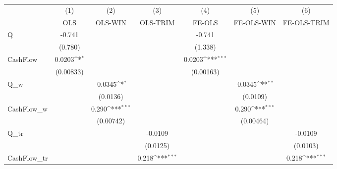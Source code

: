 {
\def\sym#1{\ifmmode^{#1}\else\(^{#1}\)\fi}
\begin{tabular}{l*{6}{c}}
\hline\hline
            &\multicolumn{1}{c}{(1)}         &\multicolumn{1}{c}{(2)}         &\multicolumn{1}{c}{(3)}         &\multicolumn{1}{c}{(4)}         &\multicolumn{1}{c}{(5)}         &\multicolumn{1}{c}{(6)}         \\
            &         OLS         &     OLS-WIN         &    OLS-TRIM         &      FE-OLS         &  FE-OLS-WIN         & FE-OLS-TRIM         \\
\hline
Q           &      -0.741         &                     &                     &      -0.741         &                     &                     \\
            &     (0.780)         &                     &                     &     (1.338)         &                     &                     \\
CashFlow    &      0.0203\sym{*}  &                     &                     &      0.0203\sym{***}&                     &                     \\
            &   (0.00833)         &                     &                     &   (0.00163)         &                     &                     \\
Q\_w         &                     &     -0.0345\sym{*}  &                     &                     &     -0.0345\sym{**} &                     \\
            &                     &    (0.0136)         &                     &                     &    (0.0109)         &                     \\
CashFlow\_w  &                     &       0.290\sym{***}&                     &                     &       0.290\sym{***}&                     \\
            &                     &   (0.00742)         &                     &                     &   (0.00464)         &                     \\
Q\_tr        &                     &                     &     -0.0109         &                     &                     &     -0.0109         \\
            &                     &                     &    (0.0125)         &                     &                     &    (0.0103)         \\
CashFlow\_tr &                     &                     &       0.218\sym{***}&                     &                     &       0.218\sym{***}\\

\end{tabular}}
